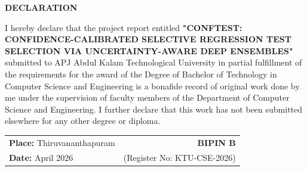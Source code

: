 \clearpage
\begin{center}
    {\Large \textbf{DECLARATION}\par}
\end{center}
\vspace{1.0cm}

I hereby declare that the project report entitled \textbf{"CONFTEST: CONFIDENCE-CALIBRATED SELECTIVE REGRESSION TEST SELECTION VIA UNCERTAINTY-AWARE DEEP ENSEMBLES"} submitted to APJ Abdul Kalam Technological University in partial fulfillment of the requirements for the award of the Degree of Bachelor of Technology in Computer Science and Engineering is a bonafide record of original work done by me under the supervision of faculty members of the Department of Computer Science and Engineering. I further declare that this work has not been submitted elsewhere for any other degree or diploma.

\vspace{2.5cm}
\noindent
\begin{tabular}{@{}p{8cm}r@{}}
    \textbf{Place:} Thiruvananthapuram & \textbf{BIPIN B} \\
    \textbf{Date:} April 2026 & (Register No: KTU-CSE-2026) \\
\end{tabular}

\clearpage
